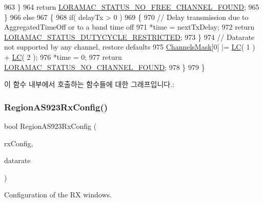 \begin{DoxyCode}
963         \}
964         \textcolor{keywordflow}{return} \mbox{\hyperlink{group___l_o_r_a_m_a_c_gga1d18f26b344040b3ec5c3db662919661a61b018814bb071d16d3f970f907fafb2}{LORAMAC\_STATUS\_NO\_FREE\_CHANNEL\_FOUND}};
965     \}
966     \textcolor{keywordflow}{else}
967     \{
968         \textcolor{keywordflow}{if}( delayTx > 0 )
969         \{
970             \textcolor{comment}{// Delay transmission due to AggregatedTimeOff or to a band time off}
971             *time = nextTxDelay;
972             \textcolor{keywordflow}{return} \mbox{\hyperlink{group___l_o_r_a_m_a_c_gga1d18f26b344040b3ec5c3db662919661a0c982ada0769ecee2e1041fb6945ddd4}{LORAMAC\_STATUS\_DUTYCYCLE\_RESTRICTED}};
973         \}
974         \textcolor{comment}{// Datarate not supported by any channel, restore defaults}
975         \mbox{\hyperlink{_region_a_s923_8c_a2188957b5ca6af8092154d7ccbfa5757}{ChannelsMask}}[0] |= \mbox{\hyperlink{group___r_e_g_i_o_n_ga12fa17e5c1016e01a9d82c25027deb1b}{LC}}( 1 ) + \mbox{\hyperlink{group___r_e_g_i_o_n_ga12fa17e5c1016e01a9d82c25027deb1b}{LC}}( 2 );
976         *time = 0;
977         \textcolor{keywordflow}{return} \mbox{\hyperlink{group___l_o_r_a_m_a_c_gga1d18f26b344040b3ec5c3db662919661a393266a9952cf6617917f1fce181efcd}{LORAMAC\_STATUS\_NO\_CHANNEL\_FOUND}};
978     \}
979 \}
\end{DoxyCode}
이 함수 내부에서 호출하는 함수들에 대한 그래프입니다.\+:
\mbox{\label{group___r_e_g_i_o_n_a_s923_ga236a04c03ccf327e5a3d1a0130e19e10}} 
\subsubsection{\texorpdfstring{Region\+A\+S923\+Rx\+Config()}{RegionAS923RxConfig()}}
{\footnotesize\ttfamily bool Region\+A\+S923\+Rx\+Config (\begin{DoxyParamCaption}\item[{\mbox{\hyperlink{group___r_e_g_i_o_n_ga375c038078dfcfc7ef14280021db719e}{Rx\+Config\+Params\+\_\+t}} $\ast$}]{rx\+Config,  }\item[{int8\+\_\+t $\ast$}]{datarate }\end{DoxyParamCaption})}



Configuration of the RX windows. 


